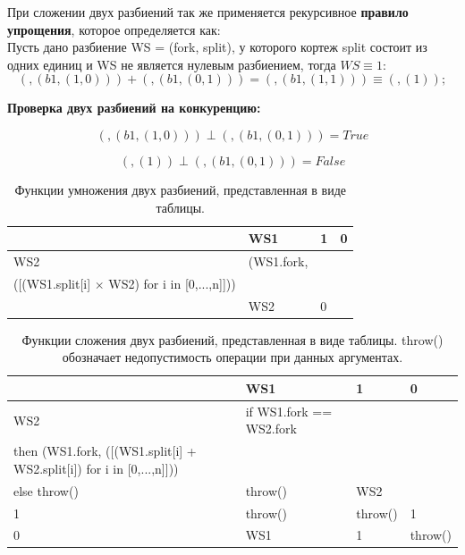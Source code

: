 \documentclass[koi8-r,usehyperref,12pt]{G7-32}
\begin{document}
При сложении двух разбиений так же применяется рекурсивное \textbf{правило упрощения}, которое определяется как:\\
 Пусть дано разбиение WS = (fork, split), у которого кортеж split состоит из одних единиц и WS не является нулевым разбиением, тогда $WS \equiv 1$:
\begin{equation}
	(, (b1, (1,0))) + (, (b1, (0,1))) = (, (b1, (1,1))) \equiv (, (1));
	\nonumber
\end{equation}

\textbf{Проверка двух разбиений на конкуренцию:}

\begin{equation}
	(, (b1, (1,0))) \perp (, (b1, (0,1))) = True
	\nonumber
\end{equation}

\begin{equation}
	(, (1)) \perp (, (b1, (0,1))) = False 
	\nonumber
\end{equation}



\begin{table}[here]
    \begin{tabular}{|l|>{\centering}m{8cm} |l|l|}
    \hline
    ~   & WS1                                                                              & 1       & 0       \\ \hline
    WS2 & (WS1.fork,\\
    ([(WS1.split[i] $\times$ WS2) for i in [0,...,n]]))\\
      & WS2  & 0    \\ \hline
    \end{tabular}
\caption{Функции умножения двух разбиений, представленная в виде таблицы. }\label{tab:mult}
\end{table}



\begin{table}[here]
    \begin{tabular}{|l|>{\centering}m{8cm} |l|l|}
    \hline
    ~   & WS1                                                                              & 1       & 0       \\ \hline
    WS2 & if WS1.fork == WS2.fork \\
    then (WS1.fork, ([(WS1.split[i] + WS2.split[i]) for i in [0,...,n]]))\\
     else throw() & throw() & WS2     \\ \hline
    1   & throw()                                                                          & throw() & 1       \\ \hline
    0   & WS1                                                                              & 1       & throw() \\ \hline
    \end{tabular}
\caption{Функции сложения двух разбиений, представленная в виде таблицы. throw() обозначает недопустимость операции при данных аргументах. }\label{tab:sum}
\end{table}
\end{document}
